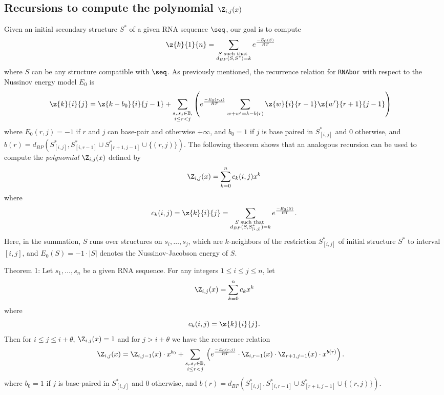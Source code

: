 \subsection*{Recursions to compute the polynomial $\Z_{i,j}(x)$}
\label{section:recursionsForPolynomialZij}

Given an initial secondary structure $S^*$ of a
given RNA sequence $\seq$, our goal is to compute
\begin{align}
\label{eq:defZk}
\z{k}{1}{n} &= \sum_{\substack{S \text{ such that }\\ d_{BP}(S,S^*)=k}}
e^{\frac{-E_0(S)}{RT}}
\end{align}
where $S$ can be any structure compatible with $\seq$.
As previously mentioned, the recurrence relation for {\tt RNAbor}
with respect to the Nussinov energy model $E_0$ is
\begin{align}
\label{eq:RNAborNussRecursion}
\z{k}{i}{j} &= \z{k-b_0}{i}{j-1} + \sum_{\substack{s_r s_j \in \mathbb{B},\\i\le r<j}}\left(e^{\frac{-E_0(r,j)}{RT}}\sum_{w+w'=k-b(r)}
\z{w}{i}{r-1}  \z{w'}{r+1}{j-1} \right)
\end{align}
where $E_0(r,j)=-1$ if $r$ and $j$ can base-pair and otherwise
$+\infty$, and
$b_0 = 1$ if $j$ is base paired in $S^*_{[i,j]}$ and $0$ otherwise, and
$b(r)=d_{BP}(S^*_{[i,j]}, S^*_{[i,r-1]} \cup S^*_{[r+1,j-1]} \cup\{(r,j)\})$.
The following theorem shows that an analogous recursion can be used to compute
the {\em polynomial} $\Z_{i,j}(x)$ defined by
\begin{eqnarray}
\label{eq:defZijpolynomial}
\Z_{i,j}(x) = \sum_{k=0}^n c_k(i,j) x^k
\end{eqnarray}
where
\[ c_k(i,j)= \z{k}{i}{j} =
\sum_{\substack{S \text{ such that }\\ d_{BP}(S,S^*_{[i,j]})=k}}
e^{\frac{-E_0(S)}{RT}}.
\]
Here, in the summation, $S$ runs over structures on $s_i,\ldots,s_j$, which
are $k$-neighbors of the restriction $S^*_{[i,j]}$ of initial structure
$S^*$ to interval $[i,j]$, and
$E_0(S)=-1 \cdot |S|$ denotes the Nussinov-Jacobson energy of $S$.
\medskip

\noindent
{\sc Theorem 1:} Let $s_1,\ldots,s_n$ be a given RNA sequence.
For any integers $1 \leq i \leq j \leq n$, let
\begin{eqnarray*}
\Z_{i,j}(x) = \sum_{k=0}^n c_k x^k
\end{eqnarray*}
where
\[ c_k(i,j)= \z{k}{i}{j}.
\]
Then  for $i\leq j \leq i+\theta$, $\Z_{i,j}(x)=1$ and for
$j>i+\theta$ we have the recurrence relation
\begin{eqnarray}
\label{eq:polynomialRecursionNussJac}
\Z_{i,j}(x) &= \Z_{i,j-1}(x) \cdot x^{b_0} +
\sum_{\substack{s_r s_j \in \mathbb{B},\\i\le r<j}}
\left(e^{\frac{-E_0(r,j)}{RT}}\cdot
\Z_{i,r-1}(x)\cdot\Z_{r+1,j-1}(x)\cdot x^{b(r)} \right).
\end{eqnarray}
\medskip
where $b_0 = 1$ if $j$ is base-paired in $S^*_{[i,j]}$ and $0$ otherwise, and
$b(r)=d_{BP}(S^*_{[i,j]}, S^*_{[i,r-1]} \cup S^*_{[r+1,j-1]} \cup\{(r,j)\})$.

